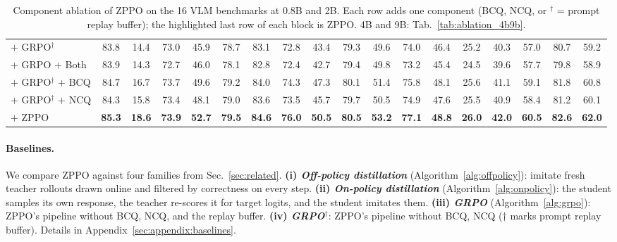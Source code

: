 \documentclass{llmxive}
\begin{document}
\begin{table}[t!]
{\begin{tabular}{l*{17}{c}}
    $+$ GRPO$^{\dagger}$ & 83.8 & 14.4 & 73.0 & 45.9 & 78.7 & 83.1 & 72.8 & 43.4 & 79.3 & 49.6 & 74.0 & 46.4 & 25.2 & 40.3 & 57.0 & 80.7 & \cellcolor{gray!10}59.2 \\
    $+$ GRPO $+$ Both & 83.9 & 14.3 & 72.7 & 46.0 & 78.1 & 82.8 & 72.4 & 42.7 & 79.4 & 49.8 & 73.2 & 45.4 & 24.5 & 39.6 & 57.7 & 79.8 & \cellcolor{gray!10}58.9 \\
    $+$ GRPO$^{\dagger}$ $+$ BCQ & 84.7 & 16.7 & 73.7 & 49.6 & 79.2 & 84.0 & 74.3 & 47.3 & 80.1 & 51.4 & 75.8 & 48.1 & 25.6 & 41.1 & 59.1 & 81.8 & \cellcolor{gray!10}60.8 \\
    $+$ GRPO$^{\dagger}$ $+$ NCQ & 84.3 & 15.8 & 73.4 & 48.1 & 79.0 & 83.6 & 73.5 & 45.7 & 79.7 & 50.5 & 74.9 & 47.6 & 25.5 & 40.9 & 58.4 & 81.2 & \cellcolor{gray!10}60.1 \\
    \rowcolor{colorful}
    $+$ ZPPO & \textbf{85.3} & \textbf{18.6} & \textbf{73.9} & \textbf{52.7} & \textbf{79.5} & \textbf{84.6} & \textbf{76.0} & \textbf{50.5} & \textbf{80.5} & \textbf{53.2} & \textbf{77.1} & \textbf{48.8} & \textbf{26.0} & \textbf{42.0} & \textbf{60.5} & \textbf{82.6} & \cellcolor{gray!10}\textbf{62.0} \\
    \bottomrule
    \end{tabular}
    }
    \vspace{-3mm}
    \caption{Component ablation of ZPPO on the 16 VLM benchmarks at 0.8B and 2B. Each row adds one component (BCQ, NCQ, or $^{\dagger}$ = prompt replay buffer); the highlighted last row of each block is ZPPO. 4B and 9B: Tab.~\ref{tab:ablation_4b9b}.}
    \label{tab:ablation}
\end{table}



\paragraph{Baselines.}
We compare ZPPO against four families from Sec.~\ref{sec:related}.
\textbf{(i) \emph{Off-policy distillation}} (Algorithm~\ref{alg:offpolicy}): imitate fresh teacher rollouts drawn online and filtered by correctness on every step.
\textbf{(ii) \emph{On-policy distillation}} (Algorithm~\ref{alg:onpolicy}): the student samples its own response, the teacher re-scores it for target logits, and the student imitates them.
\textbf{(iii) \emph{GRPO}} (Algorithm~\ref{alg:grpo}): ZPPO's pipeline without BCQ, NCQ, and the replay buffer.
\textbf{(iv) \emph{GRPO$^{\dagger}$}}: ZPPO's pipeline without BCQ, NCQ (${\dagger}$ marks prompt replay buffer). Details in Appendix~\ref{sec:appendix:baselines}.
\end{document}
